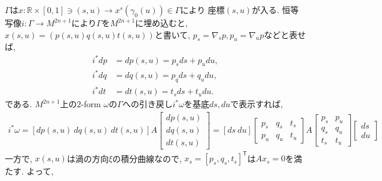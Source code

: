 \documentclass[a4paper]{ujarticle}
\numberwithin{equation}{section}
\theoremstyle{definition}
\begin{document}
    $\Gamma$は$x: \mathbb{R} \times [0, 1] \ni (s, u) \rightarrow x^{s}(\gamma_0(u)) \in \Gamma$により
    座標$(s, u)$が入る.
    恒等写像$i: \Gamma \rightarrow M^{2n + 1}$により$\Gamma$を$M^{2n + 1}$に埋め込むと,
    $x(s, u) = (p(s, u) q(s, u) t(s, u))$と書いて, $p_s = \nabla_s p, p_u = \nabla_u p$などと表せば,
    \begin{align}
        i^{*} dp &= d p(s, u) = p_s ds + p_u du, \\ 
        i^{*} dq &= d q(s, u) = p_q ds + q_u du, \\
        i^{*} dt &= d t(s, u) = t_s ds + t_u du.
    \end{align}
    である.
    $M^{2n + 1}$上の$2$-form $\omega$の$\Gamma$への引き戻し$i^{*} \omega$を基底$ds, du$で表示すれば,
    \begin{align}
        i^{*} \omega 
        = [dp(s, u) \ dq(s, u) \ dt(s, u)] A
        \begin{bmatrix}
            dp(s, u)\\
            dq(s, u)\\
            dt(s, u)
        \end{bmatrix} 
        = [ds \ du] 
        \begin{bmatrix}
            p_s &q_s &t_s\\
            p_u &q_u &t_u
        \end{bmatrix}
        A
        \begin{bmatrix}
            p_s &p_u \\
            q_s &q_u \\
            t_s &t_u
        \end{bmatrix}
        \begin{bmatrix}
            ds\\
            du
        \end{bmatrix}
    \end{align}
    一方で, $x(s, u)$は渦の方向$\xi$の積分曲線なので, 
    $x_s = [p_s, q_s, t_s]^{\mathsf{T}}$は$A x_s = 0$を満たす.
    よって, 
\end{document}

